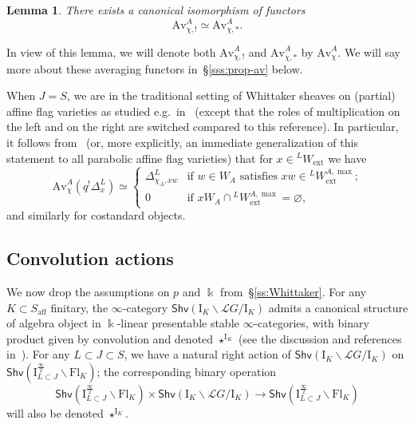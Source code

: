 \documentclass[11pt]{amsart}
\numberwithin{equation}{section}
\theoremstyle{plain}
\newtheorem{lem}[thm]{Lemma}
\theoremstyle{definition}
\newcommand{\I}{{\mathrm I}}
\renewcommand{\k}{\Bbbk}
\newcommand{\sL}{{\mathcal L}}
\newcommand{\semi}{{{\frac{\infty}{2}}}}
\newcommand{\Av}{\mathrm{Av}}
\newcommand{\ex}{\mathrm{ext}}
\newcommand{\af}{\mathrm{aff}}
\newcommand{\Shv}{\mathsf{Shv}}
\newcommand{\Fl}{\mathrm{Fl}}
\begin{document}
\begin{lem}
There exists a canonical isomorphism of functors
\[
\Av^A_{\chi,!} \simeq \Av^A_{\chi,*}.
\]
\end{lem}

In view of this lemma, we will denote both $\Av^A_{\chi,!}$ and $\Av^A_{\chi,*}$ by $\Av^A_\chi$.
We will say more about these averaging functors in~\S\ref{sss:prop-av} below. 

When $J=S$, we are in the traditional setting of Whittaker sheaves on (partial) affine flag varieties as studied e.g.~in~\cite[\S 3]{AR23} (except that the roles of multiplication on the left and on the right are switched compared to this reference). In particular, it follows from~\cite[Lemma~3.3]{AR23} (or, more explicitly, an immediate generalization of this statement to all parabolic affine flag varieties) that for $x \in {}^L W_\ex$ we have
\begin{equation}
\label{eqn:Av-chi-D-classical}
\Av^A_\chi(q^! \Delta^L_{x}) \simeq
\begin{cases}
\Delta^L_{\chi_A,xw} & \text{if $w \in W_A$ satisfies $xw \in {}^L W_\ex^{A,\max}$;} \\
0 & \text{if $xW_A \cap {}^L W_\ex^{A,\max} = \varnothing$,}
\end{cases}
\end{equation}
and similarly for costandard objects.

\subsection{Convolution actions} 
\label{ss:convolution}

We now drop the assumptions on $p$ and $\k$ from~\S\ref{ss:Whittaker}.
For any $K \subset S_\af$ finitary,
the $\infty$-category $\Shv(\I_K \backslash \sL G/\I_K)$ admits a canonical structure of algebra object in $\k$-linear presentable stable $\infty$-categories, with binary product given by convolution and denoted $\star^{\I_K}$ (see the discussion and references in~\cite[\S 2.5]{adr}). For any $L \subset J \subset S$, we have a natural right action of $\Shv \left( \I_K \backslash \sL G/\I_K \right)$ on $\Shv \left( \I^\semi_{L \subset J} \backslash \Fl_K \right)$; the corresponding binary operation
\[
\Shv \left( \I^\semi_{L \subset J} \backslash \Fl_K \right) \times \Shv \left( \I_K \backslash \sL G/\I_K \right) \to \Shv \left( \I^\semi_{L \subset J} \backslash \Fl_K \right)
\]
will also be denoted $\star^{\I_K}$.
\end{document}
